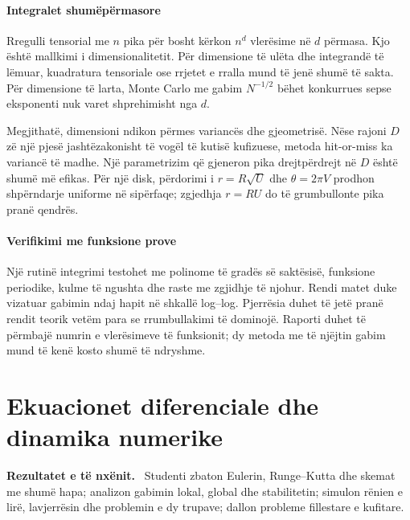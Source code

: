 \documentclass[11pt,oneside,openany]{book}
\newenvironment{qellime}{\par\medskip\noindent\textbf{Rezultatet e të nxënit.}\ }{\par\medskip}
\begin{document}
\subsubsection{Integralet shumëpërmasore}
Rregulli tensorial me $n$ pika për bosht kërkon $n^d$ vlerësime në $d$ përmasa. Kjo është mallkimi i dimensionalitetit. Për dimensione të ulëta dhe integrandë të lëmuar, kuadratura tensoriale ose rrjetet e rralla mund të jenë shumë të sakta. Për dimensione të larta, Monte Carlo me gabim $N^{-1/2}$ bëhet konkurrues sepse eksponenti nuk varet shprehimisht nga $d$.

Megjithatë, dimensioni ndikon përmes variancës dhe gjeometrisë. Nëse rajoni $D$ zë një pjesë jashtëzakonisht të vogël të kutisë kufizuese, metoda hit-or-miss ka variancë të madhe. Një parametrizim që gjeneron pika drejtpërdrejt në $D$ është shumë më efikas. Për një disk, përdorimi i $r=R\sqrt U$ dhe $\theta=2\pi V$ prodhon shpërndarje uniforme në sipërfaqe; zgjedhja $r=RU$ do të grumbullonte pika pranë qendrës.

\subsubsection{Verifikimi me funksione prove}
Një rutinë integrimi testohet me polinome të gradës së saktësisë, funksione periodike, kulme të ngushta dhe raste me zgjidhje të njohur. Rendi matet duke vizatuar gabimin ndaj hapit në shkallë log--log. Pjerrësia duhet të jetë pranë rendit teorik vetëm para se rrumbullakimi të dominojë. Raporti duhet të përmbajë numrin e vlerësimeve të funksionit; dy metoda me të njëjtin gabim mund të kenë kosto shumë të ndryshme.





\chapter{Ekuacionet diferenciale dhe dinamika numerike}
\begin{qellime}
Studenti zbaton Eulerin, Runge--Kutta dhe skemat me shumë hapa; analizon gabimin lokal, global dhe stabilitetin; simulon rënien e lirë, lavjerrësin dhe problemin e dy trupave; dallon probleme fillestare e kufitare.
\end{qellime}
\end{document}
